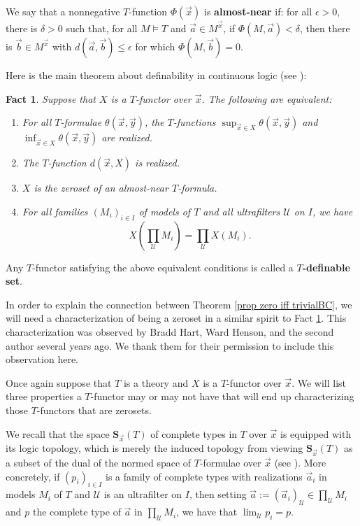 \documentclass[12pt]{amsart}
\newtheorem{fact}[thm]{Fact}
\theoremstyle{definition}
\def\u{\mathsf 1}
\def \u{\mathcal U}
\begin{document}
We say that a nonnegative $T$-function $\Phi(\vec x)$ is \textbf{almost-near} if:  for all $\epsilon>0$, there is $\delta>0$ such that, for all $M\models T$ and $\vec a\in M^{\vec x}$, if $\Phi(M,\vec a)<\delta$, then there is $\vec b\in M^{\vec x}$ with $d(\vec a,\vec b)\leq \epsilon$ for which $\Phi(M,\vec b)=0$.

Here is the main theorem about definability in continuous logic (see \cite[Theorem 2.13]{goldbringspectralgap}):

\begin{fact}\label{defsetchar}
Suppose that $X$ is a $T$-functor over $\vec x$.  The following are equivalent:
\begin{enumerate}
    \item For all $T$-formulae $\theta(\vec x,\vec y)$, the $T$-functions $\sup_{\vec x\in X}\theta(\vec x,\vec y)$ and $\inf_{\vec x\in X}\theta(\vec x,\vec y)$ are realized.
    \item The $T$-function $d(\vec x,X)$ is realized.
    \item $X$ is the zeroset of an almost-near $T$-formula.
    \item For all families $(M_i)_{i\in I}$ of models of $T$ and all ultrafilters $\u$ on $I$, we have $$X(\prod_\u M_i)=\prod_\u X(M_i).$$
\end{enumerate}
\end{fact}

Any $T$-functor satisfying the above equivalent conditions is called a \textbf{$T$-definable set}.

In order to explain the connection between Theorem \ref{prop zero iff trivialBC}, we will need a characterization of being a zeroset in a similar spirit to Fact \ref{defsetchar}.  This characterization was observed by Bradd Hart, Ward Henson, and the second author several years ago.  We thank them for their permission to include this observation here.

Once again suppose that $T$ is a theory and $X$ is a $T$-functor over $\vec x$.  We will list three properties a $T$-functor may or may  not have that will end up characterizing those $T$-functors that are zerosets.  

We recall that the space  $\mathbf{S}_{\vec x}(T)$ of complete types in $T$ over $\vec x$ is equipped with its logic topology, which is merely the induced topology from viewing $\mathbf{S}_{\vec x}(T)$ as a subset of the dual of the normed space of $T$-formulae over $\vec x$ (see \cite[ Section 2.4]{goldbringspectralgap}).  More concretely, if $(p_i)_{i\in I}$ is a family of complete types with realizations $\vec a_i$ in models $M_i$ of $T$ and $\u$ is an ultrafilter on $I$, then setting $\vec a:=(\vec a_i)_\u\in \prod_\u M_i$ and $p$  the complete type of $\vec a$ in $\prod_\u M_i$, we have that $\lim_\u p_i=p$.  
\end{document}
